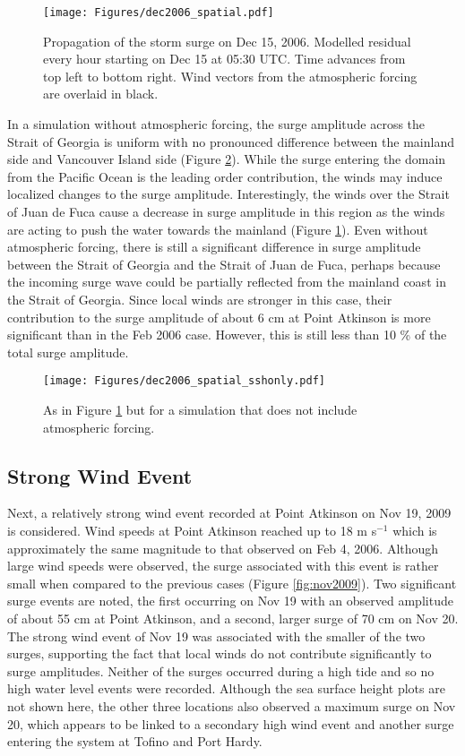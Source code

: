 \documentclass[letterpaper]{tATO2e}
\begin{document}
\begin{figure}
\centering
\texttt{[image: Figures/dec2006\_spatial.pdf]}
\caption{Propagation of the storm surge on Dec 15, 2006. Modelled residual every hour starting on Dec 15 at 05:30 UTC. Time advances from top left to bottom right. Wind vectors from the atmospheric forcing are overlaid in black.}
\label{fig:spatial}
\end{figure}

In a simulation without atmospheric forcing, the surge amplitude across the Strait of Georgia is uniform with no pronounced difference between the mainland side and Vancouver Island side (Figure \ref{fig:spatial_sshonly}). While the surge entering the domain from the Pacific Ocean is the leading order contribution, the winds may induce localized changes to the surge amplitude. Interestingly, the winds over the Strait of Juan de Fuca cause a decrease in surge amplitude in this region as the winds are acting to push the water towards the mainland {\color{red}(Figure \ref{fig:spatial})}.  {\color{red} Even without atmospheric forcing, there is still a significant difference in surge amplitude between the Strait of Georgia and the Strait of Juan de Fuca, perhaps because the incoming surge wave could be partially reflected from the mainland coast in the Strait of Georgia. Since local winds are stronger in this case, their contribution to the surge amplitude of about 6 cm at Point Atkinson is more significant than in the Feb 2006 case. However, this is still less than 10 \% of the total surge amplitude. } 

\begin{figure}
\centering
\texttt{[image: Figures/dec2006\_spatial\_sshonly.pdf]}
\caption{As in Figure \ref{fig:spatial} but for a simulation that does not include atmospheric forcing. }
\label{fig:spatial_sshonly}
\end{figure}

\subsection{Strong Wind Event}\label{sec:wind}
Next, a relatively strong wind event recorded at Point Atkinson on Nov 19, 2009 is considered. {\color{red} Wind speeds at Point Atkinson reached up to 18 m s$^{-1}$ which is approximately the same magnitude to that observed on Feb 4, 2006.}  Although large wind speeds were observed, the surge associated with this event is rather small when compared to the previous cases (Figure \ref{fig:nov2009}). Two significant surge events are noted, the first occurring on Nov 19 with an observed amplitude of about {\color{red}55 cm} at Point Atkinson, and a second, larger surge of {\color{red} 70 cm} on Nov 20. {\color{red} The strong wind event of Nov 19 was associated with the smaller of the two surges, supporting the fact that local winds do not contribute significantly to surge amplitudes.}  Neither of the surges occurred during a high tide and so no high water level events were recorded. Although {\color{red} the sea surface height plots are} not shown here, the other three locations also observed a maximum surge on Nov 20, which appears to be linked to a secondary high wind event and another surge entering the system at Tofino and Port Hardy. 
\end{document}
